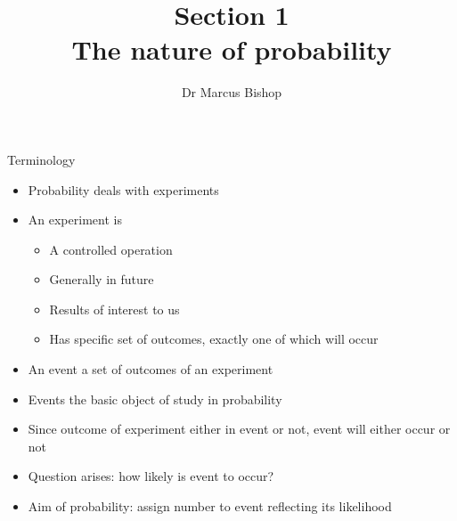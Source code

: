 \documentclass[handout]{beamer}
\title[\S1]{Section 1\\The nature of probability}
\author{Dr Marcus Bishop}
\theoremstyle{definition}
\begin{document}
\begin{frame}\titlepage\end{frame}
\LogoOff

\begin{frame}{Terminology}
\begin{itemize}
\item Probability deals with \alert{experiments}
\item An \alert{experiment} is
\begin{itemize}
\item A controlled operation
\item Generally in future
\item Results of interest to us
\item Has specific set of \alert{outcomes}, exactly
one of which will occur
\end{itemize}
\item An \alert{event} a set of outcomes of an experiment
\item Events the basic object of study in probability
\item Since outcome of experiment either in event or not,
event will either occur or not
\item Question arises: how likely is event to occur?
\item Aim of probability: assign number to event
reflecting its likelihood
\end{itemize}
\end{frame}
\end{document}
